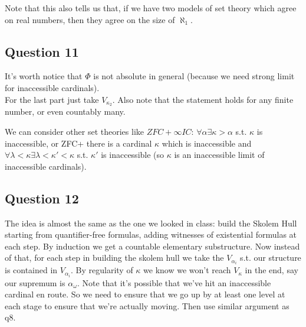 \documentclass[a4paper]{article}
\begin{document}
Note that this also tells us that, if we have two models of set theory which agree on real numbers, then they agree on the size of $\aleph_1$.

\subsection{Question 11}
It's worth notice that $\Phi$ is not absolute in general (because we need strong limit for inaccessible cardinals).\\
For the last part just take $V_{\kappa_2}$. Also note that the statement holds for any finite number, or even countably many.

We can consider other set theories like $ZFC+\infty IC$: $\forall \alpha \exists \kappa > \alpha$ s.t. $\kappa$ is inaccessible, or ZFC+ there is a cardinal $\kappa$ which is inaccessible and $\forall \lambda < \kappa \exists \lambda < \kappa' < \kappa$ s.t. $\kappa'$ is inaccessible (so $\kappa$ is an inaccessible limit of inaccessible cardinals).

\subsection{Question 12}
The idea is almost the same as the one we looked in class: build the Skolem Hull starting from quantifier-free formulas, adding witnesses of existential formulas at each step. By induction we get a countable elementary substructure. Now instead of that, for each step in building the skolem hull we take the $V_{\alpha_i}$ s.t. our structure is contained in $V_{\alpha_i}$. By regularity of $\kappa$ we know we won't reach $V_\kappa$ in the end, say our supremum is $\alpha_\omega$. Note that it's possible that we've hit an inaccessible cardinal en route. So we need to ensure that we go up by at least one level at each stage to ensure that we're actually moving. Then use similar argument as q8.
\end{document}
